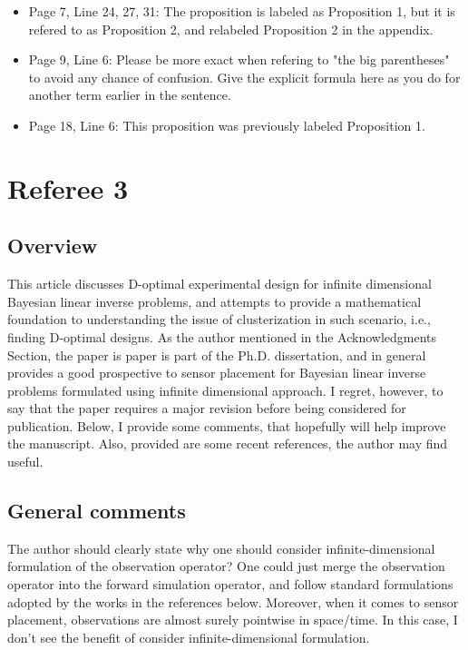 \documentclass{amsart}
\begin{document}
\begin{itemize}
\item Page 7, Line 24, 27, 31: The proposition is labeled as
  Proposition 1, but it is refered to as Proposition 2, and relabeled
  Proposition 2 in the appendix.

\item Page 9, Line 6: Please be more exact when refering to "the big
  parentheses" to avoid any chance of confusion. Give the explicit
  formula here as you do for another term earlier in the sentence.
  
\item Page 18, Line 6: This proposition was previously labeled
  Proposition 1.
\end{itemize}




\section{Referee 3}

\subsection{Overview}

This article discusses D-optimal experimental design for infinite
dimensional Bayesian linear inverse problems, and attempts to provide
a mathematical foundation to understanding the issue of clusterization
in such scenario, i.e., finding D-optimal designs.  As the author
mentioned in the Acknowledgments Section, the paper is paper is part
of the Ph.D. dissertation, and in general provides a good prospective
to sensor placement for Bayesian linear inverse problems formulated
using infinite dimensional approach.  I regret, however, to say that
the paper requires a major revision before being considered for
publication.  Below, I provide some comments, that hopefully will help
improve the manuscript.  Also, provided are some recent references,
the author may find useful.
%


\subsection{General comments}

The author should clearly state why one should consider
infinite-dimensional formulation of the observation operator? One
could just merge the observation operator into the forward simulation
operator, and follow standard formulations adopted by the works in the
references below. Moreover, when it comes to sensor placement,
observations are almost surely pointwise in space/time. In this case,
I don't see the benefit of consider infinite-dimensional formulation.
%
\end{document}
